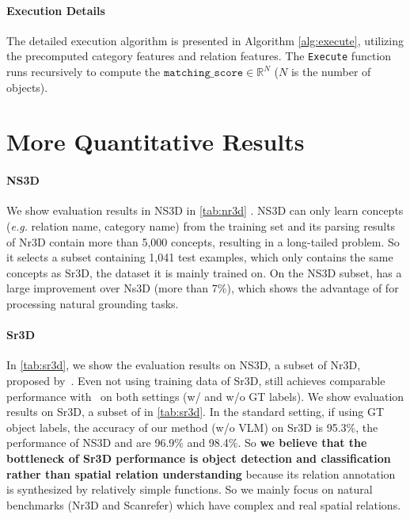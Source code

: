 \paragraph{Execution Details}
The detailed execution algorithm is presented in Algorithm \ref{alg:execute}, utilizing the precomputed category features and relation features. The \texttt{Execute} function runs recursively to compute the $\texttt{matching\_score} \in \mathbb{R}^{N}$ ($N$ is the number of objects).

\section{More Quantitative Results}
\label{appendix:sr3d_results}
\paragraph{NS3D}
We show evaluation results in NS3D\citep{hsu2023ns3d} in \autoref{tab:nr3d}
.
NS3D can only learn concepts (\textit{e.g.} relation name, category name) from the training set and its parsing results of Nr3D contain more than 5,000 concepts, resulting in a long-tailed problem. So it selects a subset containing 1,041 test examples, which only contains the same concepts as Sr3D, the dataset it is mainly trained on. On the NS3D subset, \ourmethod has a large improvement over Ns3D (more than 7\%), which shows the advantage of \ourmethod for processing natural grounding tasks.

\paragraph{Sr3D}
In \autoref{tab:sr3d}, we show the evaluation results on NS3D, a subset of Nr3D, proposed by~\cite{hsu2023ns3d}. 
Even not using training data of Sr3D, \ourmethod still achieves comparable performance with~\cite{hsu2023ns3d} on both settings (w/ and w/o GT labels).
We show evaluation results on Sr3D, a subset of \cite{achlioptas2020referit3d} in \autoref{tab:sr3d}.
In the standard setting, 
if using GT object labels, the accuracy of our method (w/o VLM) on Sr3D is 95.3\%, the performance of NS3D and \cite{fang2024transcrib3d} are 96.9\% and 98.4\%. So \textbf{we believe that the bottleneck of Sr3D performance is object detection and classification rather than spatial relation understanding} because its relation annotation is synthesized by relatively simple functions. 
So we mainly focus on natural benchmarks (Nr3D and Scanrefer) which have complex and real spatial relations. 

